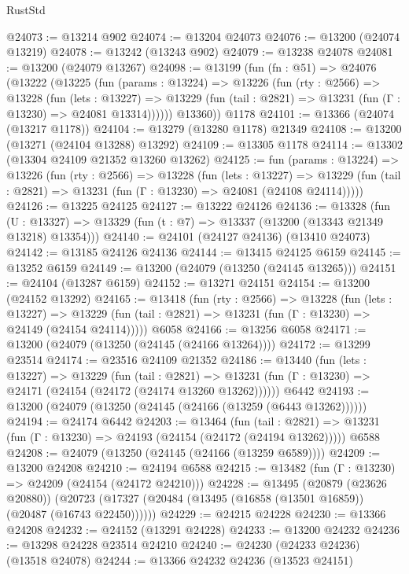\begin{lexlean}{RustStd}
\begin{coremodule}
@24073 := @13214 @902
@24074 := @13204 @24073
@24076 := @13200 (@24074 @13219)
@24078 := @13242 (@13243 @902)
@24079 := @13238 @24078
@24081 := @13200 (@24079 @13267)
@24098 := @13199
    (fun (fn : @51) =>
    @24076
      (@13222
        (@13225
          (fun (params : @13224) =>
          @13226
            (fun (rty : @2566) =>
            @13228
              (fun (lets : @13227) =>
              @13229 (fun (tail : @2821) => @13231 (fun (Γ : @13230) => @24081 @13314))))))
        @13360))
    @1178
@24101 := @13366 (@24074 (@13217 @1178))
@24104 := @13279 (@13280 @1178) @21349
@24108 := @13200 (@13271 (@24104 @13288) @13292)
@24109 := @13305 @1178
@24114 := @13302 (@13304 @24109 @21352 @13260 @13262)
@24125 := fun (params : @13224) =>
  @13226
    (fun (rty : @2566) =>
    @13228
      (fun (lets : @13227) =>
      @13229 (fun (tail : @2821) => @13231 (fun (Γ : @13230) => @24081 (@24108 @24114)))))
@24126 := @13225 @24125
@24127 := @13222 @24126
@24136 := @13328
    (fun (U : @13327) => @13329 (fun (t : @7) => @13337 (@13200 (@13343 @21349 @13218) @13354)))
@24140 := @24101 (@24127 @24136) (@13410 @24073)
@24142 := @13185 @24126 @24136
@24144 := @13415 @24125 @6159
@24145 := @13252 @6159
@24149 := @13200 (@24079 (@13250 (@24145 @13265)))
@24151 := @24104 (@13287 @6159)
@24152 := @13271 @24151
@24154 := @13200 (@24152 @13292)
@24165 := @13418
    (fun (rty : @2566) =>
    @13228
      (fun (lets : @13227) =>
      @13229 (fun (tail : @2821) => @13231 (fun (Γ : @13230) => @24149 (@24154 @24114)))))
    @6058
@24166 := @13256 @6058
@24171 := @13200 (@24079 (@13250 (@24145 (@24166 @13264))))
@24172 := @13299 @23514
@24174 := @23516 @24109 @21352
@24186 := @13440
    (fun (lets : @13227) =>
    @13229
      (fun (tail : @2821) =>
      @13231 (fun (Γ : @13230) => @24171 (@24154 (@24172 (@24174 @13260 @13262))))))
    @6442
@24193 := @13200 (@24079 (@13250 (@24145 (@24166 (@13259 (@6443 @13262))))))
@24194 := @24174 @6442
@24203 := @13464
    (fun (tail : @2821) => @13231 (fun (Γ : @13230) => @24193 (@24154 (@24172 (@24194 @13262)))))
    @6588
@24208 := @24079 (@13250 (@24145 (@24166 (@13259 @6589))))
@24209 := @13200 @24208
@24210 := @24194 @6588
@24215 := @13482 (fun (Γ : @13230) => @24209 (@24154 (@24172 @24210)))
@24228 := @13495
    (@20879 (@23626 @20880))
    (@20723 (@17327 (@20484 (@13495 (@16858 (@13501 @16859)) (@20487 (@16743 @22450))))))
@24229 := @24215 @24228
@24230 := @13366 @24208
@24232 := @24152 (@13291 @24228)
@24233 := @13200 @24232
@24236 := @13298 @24228 @23514 @24210
@24240 := @24230 (@24233 @24236) (@13518 @24078)
@24244 := @13366 @24232 @24236 (@13523 @24151)

\end{coremodule}
\end{lexlean}
